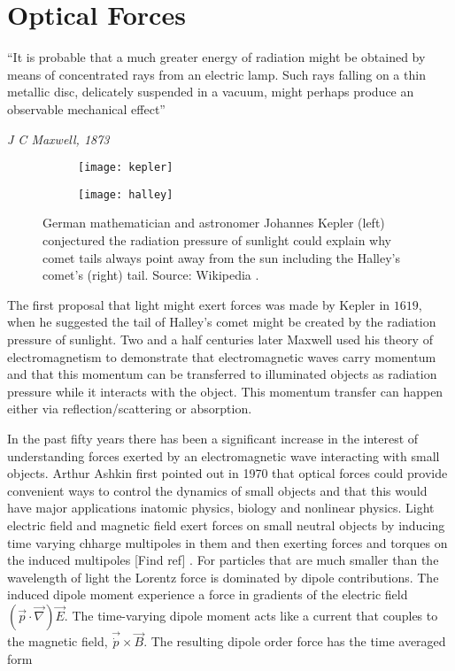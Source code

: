 \section{Optical Forces}

\setlength{\epigraphwidth}{0.8\textwidth}
\epigraph{``It is probable that a much greater energy of radiation might be obtained by means of concentrated rays from an electric lamp. Such rays falling on a thin metallic disc, delicately suspended in a vacuum, might perhaps produce an observable mechanical effect''}{\textit{J C Maxwell, 1873}}

\begin{figure}
\begin{subfigure}{.4\textwidth}
  \centering
  \texttt{[image: kepler]}
  \label{fig:kepler}
\end{subfigure}%
\begin{subfigure}{.4\textwidth}
  \centering
  \texttt{[image: halley]}
  \label{fig:halley}
\end{subfigure}
\caption{German mathematician and astronomer Johannes Kepler (left) conjectured the radiation pressure of sunlight could explain why comet tails always point away from the sun including the Halley's comet's (right) tail. Source: Wikipedia \cite{kepler_pic, halley_comet}.}
\label{fig:kepler_halley}
\end{figure}

The first proposal that light might exert forces was made by Kepler in $1619$, when he suggested the tail of Halley's comet might be created by the radiation pressure of sunlight. Two and a half centuries later Maxwell used his theory of electromagnetism to demonstrate that electromagnetic waves carry momentum and that this momentum can be transferred to illuminated objects as radiation pressure while it interacts with the object. This momentum transfer can happen either via reflection/scattering or absorption. 

In the past fifty years there has been a significant increase in the interest of understanding forces exerted by an electromagnetic wave interacting with small objects. Arthur Ashkin first pointed out in 1970 that optical forces could provide convenient ways to control the dynamics of small objects and that this would have major applications inatomic physics, biology and nonlinear physics. Light electric field and magnetic field exert forces on small neutral objects by inducing time varying chharge multipoles in them and then exerting forces and torques on the induced multipoles [Find ref] \cite{jackson_classical_1999,Chaumet:00, gordon1973, Dungey:91}. For particles that are much smaller than the wavelength of light the Lorentz force is dominated by dipole contributions. The induced dipole moment experience a force in gradients of the electric field  $(\vec{p}\cdot \vec{\nabla})\vec{E}$. The time-varying dipole moment acts like a current that couples to the magnetic field, $\vec{\dot{p}}\times \vec{B}$. The resulting dipole order force has the time averaged form \cite{gordon1973}

